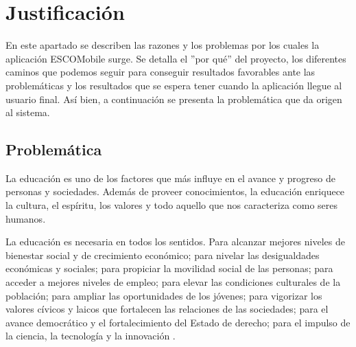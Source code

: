 \section{Justificación}

\noindent
En este apartado se describen las razones y los problemas por los cuales la aplicación ESCOMobile surge. Se detalla el ''por qué'' del proyecto, los diferentes caminos que podemos seguir para conseguir resultados favorables ante las problemáticas y los resultados que se espera tener cuando la aplicación llegue al usuario final. Así bien, a continuación se presenta la problemática que da origen al sistema. 

\subsection{Problemática}

\noindent
La educación es uno de los factores que más influye en el avance y progreso de personas y sociedades. 
Además de proveer conocimientos, la educación enriquece la cultura, el espíritu, los valores y todo aquello 
que nos caracteriza como seres humanos.

\noindent
La educación es necesaria en todos los sentidos. Para alcanzar mejores niveles de bienestar social y de 
crecimiento económico; para nivelar las desigualdades económicas y sociales; para propiciar la movilidad 
social de las personas; para acceder a mejores niveles de empleo; para elevar las condiciones culturales de 
la población; para ampliar las oportunidades de los jóvenes; para vigorizar los valores cívicos y laicos 
que fortalecen las relaciones de las sociedades; para el avance democrático y el fortalecimiento del Estado 
de derecho; para el impulso de la ciencia, la tecnología y la innovación \cite{Importancia_Educacion_UNAM}.

